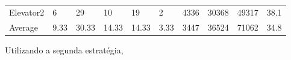 \documentclass[a4paper]{article}
\begin{document}
\begin{table}[h]
\begin{tabular}{@{}llllllllll@{}}
Elevator2 & 6        & 29            & 10           & 19                                                               & 2                                                                  & 4336                                                         & 30368                                                 & 49317                                                   & 38.1         \\
Average   & 9.33     & 30.33         & 14.33        & 14.33                                                               & 3.33                                                               & 3447                                                         & 36524                                                 & 71062                                                   & 34.8          \\ \bottomrule
\end{tabular}
\end{table}

Utilizando a segunda estratégia,
\end{document}
